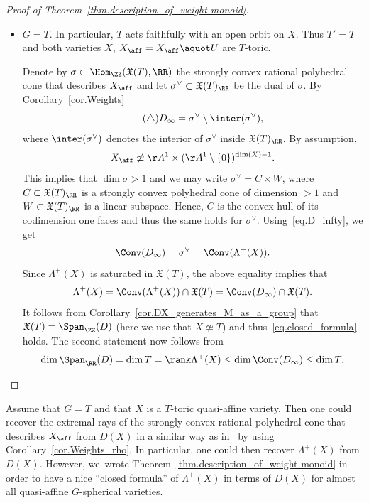 \begin{proof}[Proof of Theorem~\ref{thm.description_of_weight-monoid}]
\begin{itemize}
\item $G = T$. In particular, $T$ acts faithfully with an open orbit on $X$. Thus
$T' = T$ and both varieties $X$, $X_{\aff} = X_{\aff} \aquot U$ are $T$-toric.

Denote by $\sigma \subset \Hom_{\ZZ}(\mathfrak{X}(T), \RR)$ the strongly convex
rational polyhedral cone that describes $X_{\aff}$ and let
$\sigma^\vee \subset \mathfrak{X}(T)_{\RR}$ be the dual of $\sigma$.
By Corollary~\ref{cor.Weights}
\[
\label{eq.D_infty}
\tag{$\triangle$}
D_{\infty} = \sigma^\vee \setminus \inter(\sigma^\vee),
\]
where $\inter(\sigma^\vee)$ denotes the interior of $\sigma^\vee$ inside $\mathfrak{X}(T)_{\RR}$.
By assumption,
\[
X_{\aff} \not\simeq \AA^1 \times (\AA^1 \setminus \{0\})^{\dim(X)-1}.
\]
This implies that
$\dim \sigma > 1$ and we may write $\sigma^\vee = C \times W$, where
$C \subset \mathfrak{X}(T)_\RR$
is a strongly convex polyhedral cone of dimension $> 1$
and $W \subset \mathfrak{X}(T)_\RR$ is a linear subspace.
Hence, $C$ is the convex hull of its codimension one faces and thus the same holds
for $\sigma^\vee$. Using~\eqref{eq.D_infty}, we get
\[
\Conv(D_{\infty}) = \sigma^\vee = \Conv(\Lambda^+(X)).
\]
Since $\Lambda^+(X)$ is saturated in $\mathfrak{X}(T)$, the above equality implies that
\[
\Lambda^+(X) = \Conv(\Lambda^+(X)) \cap \mathfrak{X}(T) =
\Conv(D_\infty) \cap \mathfrak{X}(T).
\]
It follows from Corollary~\ref{cor.DX_generates_M_as_a_group} that
$\mathfrak{X}(T) = \Span_{\ZZ}(D)$ (here we use that $X \not\simeq T$)
and thus~\eqref{eq.closed_formula} holds. The second statement now follows from
\[
\dim \Span_{\RR}(D) = \dim T = \rank \Lambda^+(X) \leq
\dim \Conv(D_\infty) \leq \dim T.\qedhere
\]
\end{itemize}
\end{proof}

\begin{remark}
Assume that $G = T$ and that $X$ is a $T$-toric quasi-affine variety.
Then one could recover the extremal rays of the strongly convex rational polyhedral
cone that describes $X_{\aff}$ from $D(X)$ in a similar
way as in~\cite[Lem.\,6.11]{LiReUr2018Characterization-o} by using Corollary~\ref{cor.Weights_rho}.
In particular, one could then recover $\Lambda^+(X)$ from $D(X)$.
However, we~wrote Theorem~\ref{thm.description_of_weight-monoid} in order to have a nice
``closed formula''
of $\Lambda^+(X)$ in terms of $D(X)$ for almost all quasi-affine $G$-spherical varieties.
\end{remark}

